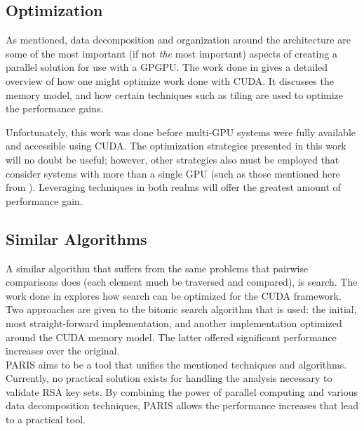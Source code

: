 \documentclass[smallextended]{svjour3}       %
\begin{document}
\subsection{Optimization}
\label{subsec:opti}
As mentioned, data decomposition and organization around the architecture are
some of the most important (if not \emph{the} most important) aspects of
creating a parallel solution for use with a GPGPU. The work done in
\cite{ryoo2008optimization} gives a detailed overview of how one might optimize
work done with CUDA. It discusses the memory model, and how certain techniques
such as tiling are used to optimize the performance gains.

Unfortunately, this work was done before multi-GPU systems were fully available
and accessible using CUDA. The optimization strategies presented in this work
will no doubt be useful; however, other strategies also must be employed that
consider systems with more than a single GPU (such as those mentioned here
from \cite{thibault2009cuda}). Leveraging techniques in both realms will offer
the greatest amount of performance gain.

\subsection{Similar Algorithms}
\label{subsec:simialg}
A similar algorithm that suffers from the same problems that pairwise
comparisons does (each element much be traversed and compared), is search. The
work done in \cite{peters2011fast} explores how search can be optimized for the
CUDA framework. Two approaches are given to the bitonic search algorithm that
is used: the initial, most straight-forward implementation, and another
implementation optimized around the CUDA memory model. The latter offered
significant performance increases over the original.\\


\noindent
PARIS aims to be a tool that unifies the mentioned techniques and algorithms.
Currently, no practical solution exists for handling the analysis necessary to
validate RSA key sets. By combining the power of parallel computing and various
data decomposition techniques, PARIS allows the performance increases that lead
to a practical tool.
\end{document}
